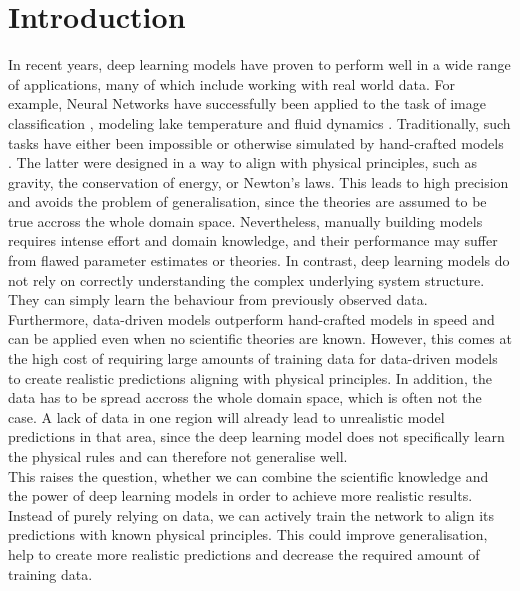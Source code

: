 \label{section:introduction}
\section{Introduction}

In recent years, deep learning models have proven to perform well in a wide range of applications, many of which include working with real world data. For example, Neural Networks have successfully been applied to the task of image classification \cite{NIPS2012_4824}, modeling lake temperature \cite{DBLP:journals/corr/abs-1710-11431} and fluid dynamics \cite{DBLP:journals/corr/SinghMD16}. Traditionally, such tasks have either been impossible or otherwise simulated by hand-crafted models \cite{Cursi2005PhysicallyCN}. The latter were designed in a way to align with physical principles, such as gravity, the conservation of energy, or Newton's laws. This leads to high precision and avoids the problem of generalisation, since the theories are assumed to be true accross the whole domain space. Nevertheless, manually building models requires intense effort and domain knowledge, and their performance may suffer from flawed parameter estimates or theories. In contrast, deep learning models do not rely on correctly understanding the complex underlying system structure. They can simply learn the behaviour from previously observed data. Furthermore, data-driven models outperform hand-crafted models in speed and can be applied even when no scientific theories are known. However, this comes at the high cost of requiring large amounts of training data for data-driven models to create realistic predictions aligning with physical principles. In addition, the data has to be spread accross the whole domain space, which is often not the case. A lack of data in one region will already lead to unrealistic model predictions in that area, since the deep learning model does not specifically learn the physical rules and can therefore not generalise well.\\
\indent This raises the question, whether we can combine the scientific knowledge and the power of deep learning models in order to achieve more realistic results. Instead of purely relying on data, we can actively train the network to align its predictions with known physical principles. This could improve generalisation, help to create more realistic predictions and decrease the required amount of training data.\\


\clearpage

